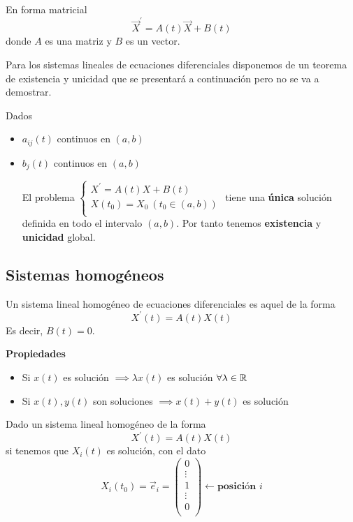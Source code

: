En forma matricial
$$\vec{X}^\prime = A(t)\vec{X}+B(t)$$ donde $A$ es una matriz y $B$ es un vector.

Para los sistemas lineales de ecuaciones diferenciales disponemos de un teorema de existencia y unicidad que se presentará a continuación pero no se va a demostrar.

\begin{theorem}
Dados
\begin{itemize}
\item $a_{ij}(t)$ continuos en $(a,b)$
\item $b_j(t)$ continuos en $(a,b)$

El problema $
  \left\lbrace
  \begin{array}{l}
     X^\prime = A(t)X+B(t)\\
     X(t_0) = X_0\ (t_0\in(a,b))\\
  \end{array}
  \right.
$
tiene una \textbf{única} solución definida en todo el intervalo $(a,b)$. Por tanto tenemos \textbf{existencia} y \textbf{unicidad} global.
\end{itemize}
\end{theorem}

\subsection{Sistemas homogéneos}
\begin{definition}
Un sistema lineal homogéneo de ecuaciones diferenciales es aquel de la forma $$X^\prime(t) = A(t)X(t)$$ Es decir, $B(t) = 0$.
\end{definition}
\noindent\textbf{Propiedades}
\begin{itemize}
\item Si $x(t)$ es solución $\implies \lambda x(t)$ es solución $\forall \lambda \in \mathbb{R}$ 
\item Si $x(t), y(t)$ son soluciones $\implies x(t)+y(t)$ es solución
\end{itemize}

\obs 

Dado un sistema lineal homogéneo de la forma $$X^\prime(t) = A(t)X(t)$$ si tenemos que $X_i(t)$ es solución, con el dato $$X_i(t_0) = \vec{e}_i = \begin{pmatrix}
0\\
\vdots\\
1\\
\vdots\\
0\\
\end{pmatrix} \leftarrow \textbf{posición } i$$


